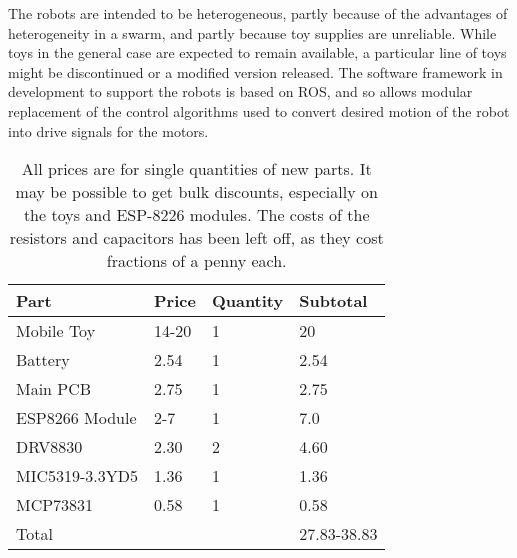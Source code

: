 The robots are intended to be heterogeneous, partly because of the advantages of heterogeneity in a swarm, and partly because toy supplies are unreliable.
While toys in the general case are expected to remain available, a particular line of toys might be discontinued or a modified version released. 
The software framework in development to support the robots is based on ROS, and so allows modular replacement of the control algorithms used to convert desired motion of the robot into drive signals for the motors. 

\begin{table}
	\begin{tabular}{l l l l}
	Part & Price & Quantity & Subtotal\\
	\hline
	Mobile Toy & 14-20 & 1 & 20 \\
	Battery & 2.54 & 1 & 2.54 \\
	Main PCB & 2.75 &  1 & 2.75 \\
	ESP8266 Module & 2-7 & 1 & 7.0 \\
	DRV8830 & 2.30 & 2 & 4.60 \\
	MIC5319-3.3YD5 & 1.36 & 1 & 1.36 \\
	MCP73831 & 0.58 & 1 & 0.58 \\
	Total & & & 27.83-38.83\\
	\end{tabular}
	\caption{All prices are for single quantities of new parts. It may be possible to get bulk discounts, especially on the toys and ESP-8226 modules. The costs of the resistors and capacitors has been left off, as they cost fractions of a penny each.}
\end{table}

